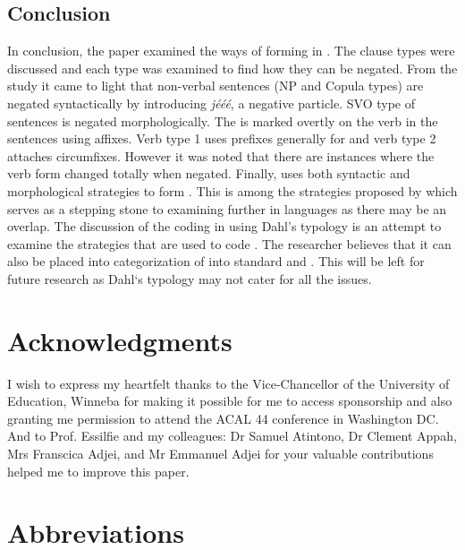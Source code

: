 \documentclass[output=paper,newtxmath,modfonts,nonflat,draftmode]{langsci/langscibook}
\begin{document}
\subsection{\label{sec:ollennu:3.1} Conclusion}

In conclusion, the paper examined the ways of forming  in . The clause types were discussed and each type was examined to find how they can be negated. From the study it came to light that non-verbal sentences (NP and Copula types) are negated syntactically by introducing \textit{jééé}, a {negative particle}. SVO type of sentences is negated morphologically. The  is marked overtly on the verb in the sentences using affixes. Verb type 1 uses prefixes generally for  and verb type 2 attaches circumfixes. However it was noted that there are instances where the verb form changed totally when negated. Finally,  uses both syntactic and morphological strategies to form . This is among the strategies proposed by \citet{dahl1979typology} which serves as a stepping stone to examining  further in  languages as there may be an overlap. The discussion of the  coding in  using Dahl’s typology is an attempt to examine the strategies that are used to code . The researcher believes that it can also be placed into \citet{Miestamo2007} categorization of  into standard and . This will be left for future research as Dahl‘s typology may not cater for all the issues.

\section*{Acknowledgments}
I wish to express my heartfelt thanks to the Vice-Chancellor of the University of Education, Winneba for making it possible for me to access sponsorship and also granting me permission to attend the ACAL 44 conference in Washington DC. And to Prof. Essilfie and my colleagues: Dr Samuel Atintono, Dr Clement Appah, Mrs Franscica Adjei, and Mr Emmanuel Adjei for your valuable contributions helped me to improve this paper.
 
\section*{Abbreviations}
\end{document}
